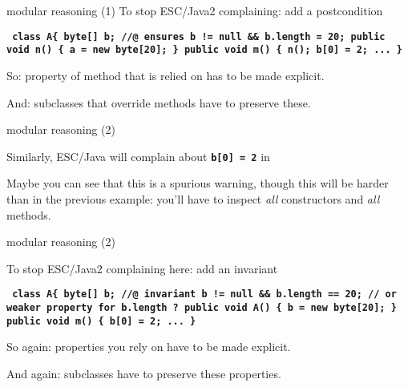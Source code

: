 \documentclass[
pdf,
nocolorBG,
slideColor,
erik,
]{prosper}
\newcommand{\code}[1]{{\rm \texttt{\textbf{\small #1}}}}
\begin{document}
\begin{slide}{modular reasoning (1)}
\vspace*{-3ex}
To stop ESC/Java2 complaining: add a postcondition
\begin{alltt}\code{ class A\{
  byte[] b;
 {\green //@ ensures b != null && b.length = 20;}
  public void n() \{ a = new byte[20]; \}
  public void m() \{ n();
                    b[0] = 2;
                    ...       \} 
}
\end{alltt}
So: property of method that is relied on has to be made explicit.

And: subclasses that override methods have to preserve these.

\end{slide}

\begin{slide}{modular reasoning (2)}
\vspace*{-3ex}

Similarly, ESC/Java will complain about \code{b[0] = 2} in

Maybe you can see that this is a spurious warning, though this will be
harder than in the previous example: you'll have to inspect {\em all}
constructors and {\em all} methods.

\end{slide}

\begin{slide}{modular reasoning (2)}
\vspace*{-3ex}

To stop ESC/Java2 complaining here: add an invariant

\begin{alltt}\code{ class A\{
  byte[] b;
  {\green //@ invariant b != null && b.length == 20;}
  {\green     // or weaker property for b.length ?}
  public void A() \{ b = new byte[20]; \}
  public void m() \{ b[0] = 2;
                    ...  \}
}
\end{alltt}

So again: properties you rely on have to be made explicit.

\medskip

And again: subclasses have to preserve these properties.

\end{slide}
\end{document}
